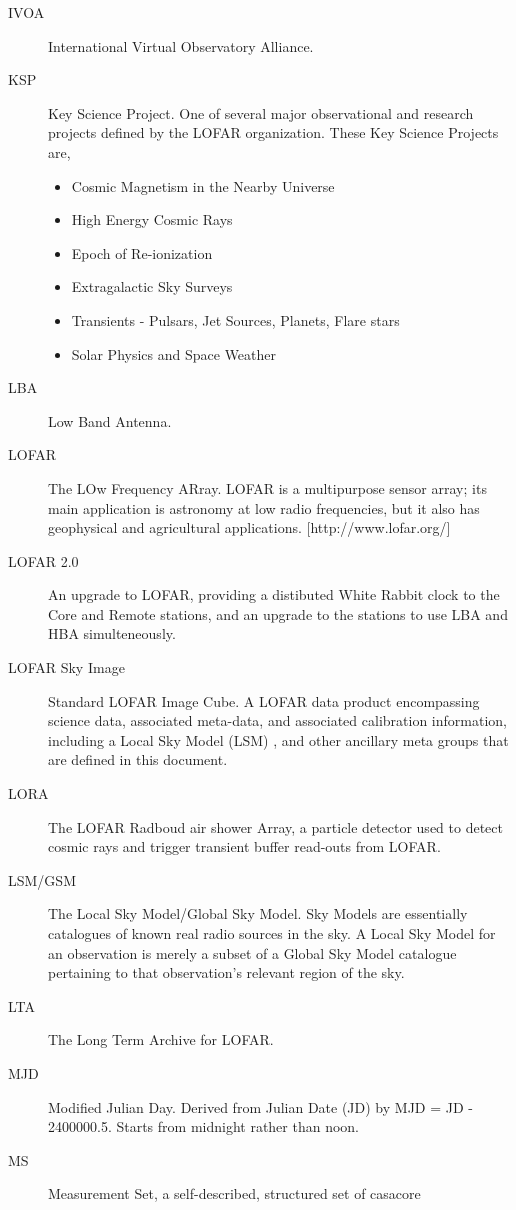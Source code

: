 \begin{description}
\item[IVOA] International Virtual Observatory Alliance.
\item[KSP] Key Science Project.  One of several major observational
  and research projects defined by the LOFAR organization. These Key
  Science Projects are,
  \begin{itemize}
  \item Cosmic Magnetism in the Nearby Universe
  \item High Energy Cosmic Rays
  \item Epoch of Re-ionization
  \item Extragalactic Sky Surveys
  \item Transients - Pulsars, Jet Sources, Planets, Flare stars
  \item Solar Physics and Space Weather
  \end{itemize}
\item[LBA] Low Band Antenna.
\item[LOFAR] The LOw Frequency ARray. LOFAR is a multipurpose sensor array;
  its main application is astronomy at low radio frequencies, but it also has
  geophysical and agricultural applications.  [http://www.lofar.org/]
\item[LOFAR 2.0] An upgrade to LOFAR, providing a distibuted White Rabbit clock to
the Core and Remote stations, and an upgrade to the stations to use LBA and HBA simulteneously.
\item[LOFAR Sky Image] Standard LOFAR Image Cube.  A LOFAR data
  product encompassing science data, associated meta-data, and
  associated calibration information, including a Local Sky Model
  (LSM) , and other ancillary meta groups that are defined in this
  document.
\item[LORA] The LOFAR Radboud air shower Array, a particle detector used to detect cosmic rays and
trigger transient buffer read-outs from LOFAR.
\item[LSM/GSM] The Local Sky Model/Global Sky Model.  Sky Models are
  essentially catalogues of known real radio sources in the sky.  A
  Local Sky Model for an observation is merely a subset of a Global
  Sky Model catalogue pertaining to that observation's relevant region
  of the sky.
\item[LTA] The Long Term Archive for LOFAR.
\item[MJD] Modified Julian Day. Derived from Julian Date (JD) by MJD =
  JD -  2400000.5. Starts from midnight rather than noon.
\item[MS] Measurement Set, a self-described, structured set of casacore

\end{description}
